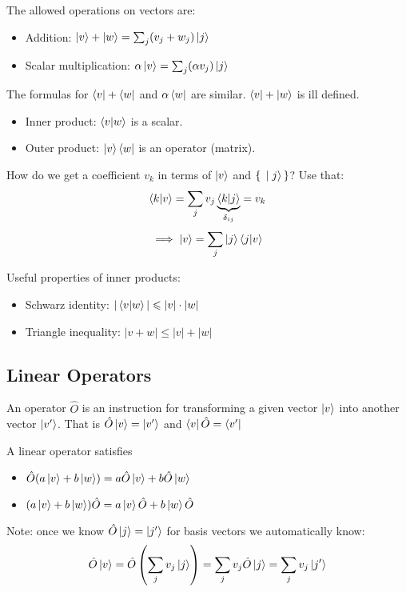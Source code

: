 The allowed operations on vectors are:

\begin{itemize}
\item Addition: $\ket{v} + \ket{w} = \sum_j (v_j + w_j)\ket{j}$
\item Scalar multiplication: $\alpha \ket{v} = \sum_j (\alpha v_j) \ket{j}$
\end{itemize}

The formulas for $\bra{v} + \bra{w}$ and $\alpha \bra{w}$ are similar. $\bra{v} + \ket{w}$ is ill defined.

\begin{itemize}
\item Inner product: $\braket{v|w}$ is a scalar.
\item Outer product: $\ket{v}\bra{w}$ is an operator (matrix).
\end{itemize}

How do we get a coefficient $v_k$ in terms of $\ket{v}$ and $\set{\ket{j}}$? Use that: $$\braket{k|v} = \sum_j v_j \underbrace{\braket{k|j}}_{\delta_{ij}} = v_k$$ $$\implies \ket{v} = \sum_j \ket{j} \braket{j|v}$$

Useful properties of inner products:

\begin{itemize}
\item Schwarz identity: $|\braket{v|w}| \leqslant |v| \cdot |w|$
\item Triangle inequality: $|v+w| \leq |v| + |w|$
\end{itemize}

\subsection{Linear Operators}

An operator $\hat{O}$ is an instruction for transforming a given vector $\ket{v}$ into another vector $\ket{v'}$. That is $\hat{O} \ket{v} = \ket{v'}$ and $\bra{v} \hat{O} = \bra{v'}$

A linear operator satisfies
\begin{itemize}
\item $\hat{O} (a \ket{v} + b \ket{w}) = a \hat{O} \ket{v} + b \hat{O} \ket{w}$
\item $(a \ket{v} + b \ket{w}) \hat{O} = a \ket{v} \hat{O} + b \ket{w} \hat{O}$
\end{itemize}

Note: once we know $\hat{O} \ket{j} = \ket{j'}$ for basis vectors we automatically know: $$\hat{O} \ket{v} = \hat{O} \left(\sum_j v_j \ket{j}\right) = \sum_j v_j \hat{O} \ket{j} = \sum_j v_j \ket{j'}$$

